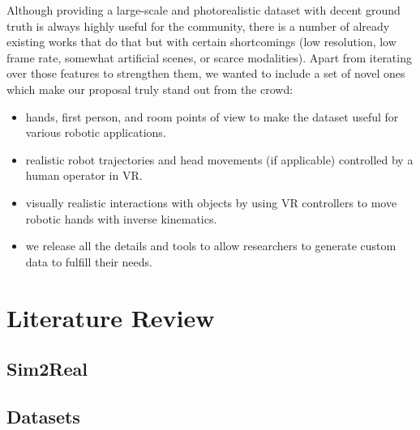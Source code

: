 Although providing a large-scale and photorealistic dataset with decent ground truth is always highly useful for the community, there is a number of already existing works that do that but with certain shortcomings (low resolution, low frame rate, somewhat artificial scenes, or scarce modalities). Apart from iterating over those features to strengthen them, we wanted to include a set of novel ones which make our proposal truly stand out from the crowd:

\begin{itemize}
    \item hands, first person, and room points of view to make the dataset useful for various robotic applications.
    \item realistic robot trajectories and head movements (if applicable) controlled by a human operator in \ac{VR}.
    \item visually realistic interactions with objects by using \ac{VR} controllers to move robotic hands with inverse kinematics.
    \item we release all the details and tools to allow researchers to generate custom data to fulfill their needs.
\end{itemize}

\clearpage

\section{Literature Review}
\label{cha:sim2real:sec:related_works}

\subsection{Sim2Real}

\subsection{Datasets}

